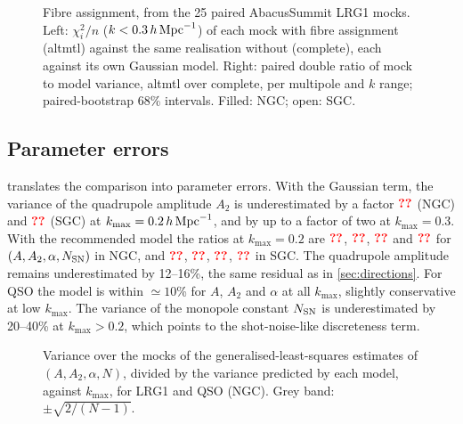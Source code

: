 \begin{figure}
  \centering{}
  \caption{Fibre assignment, from the 25 paired AbacusSummit LRG1 mocks. Left: $\chi^2_i/n$ ($k<0.3\,h\,\mathrm{Mpc}^{-1}$) of each mock with fibre assignment (altmtl) against the same realisation without (complete), each against its own Gaussian model. Right: paired double ratio of mock to model variance, altmtl over complete, per multipole and $k$ range; paired-bootstrap $68$\% intervals. Filled: NGC; open: SGC.}
  \label{fig:fiber}
\end{figure}

\subsection{Parameter errors}
\label{sec:params}

 translates the comparison into parameter errors. With the Gaussian term, the variance of the quadrupole amplitude $A_2$ is underestimated by a factor $\val{par/LRG1/NGC/G/0.200/A2}$ (NGC) and $\val{par/LRG1/SGC/G/0.200/A2}$ (SGC) at $k_{\max}=0.2\,h\,\mathrm{Mpc}^{-1}$, and by up to a factor of two at $k_{\max}=0.3$. With the recommended model the ratios at $k_{\max}=0.2$ are $\val{par/LRG1/NGC/rec/0.200/A}$, $\val{par/LRG1/NGC/rec/0.200/A2}$, $\val{par/LRG1/NGC/rec/0.200/alpha}$ and $\val{par/LRG1/NGC/rec/0.200/SN}$ for $(A,A_2,\alpha,N_{\rm SN})$ in NGC, and $\val{par/LRG1/SGC/rec/0.200/A}$, $\val{par/LRG1/SGC/rec/0.200/A2}$, $\val{par/LRG1/SGC/rec/0.200/alpha}$, $\val{par/LRG1/SGC/rec/0.200/SN}$ in SGC. The quadrupole amplitude remains underestimated by 12--16\%, the same residual as in \cref{sec:directions}. For QSO the model is within $\simeq10$\% for $A$, $A_2$ and $\alpha$ at all $k_{\max}$, slightly conservative at low $k_{\max}$. The variance of the monopole constant $N_{\rm SN}$ is underestimated by 20--40\% at $k_{\max}>0.2$, which points to the shot-noise-like discreteness term.

\begin{figure}
  \centering{}
  \caption{Variance over the mocks of the generalised-least-squares estimates of $(A,A_2,\alpha,N)$, divided by the variance predicted by each model, against $k_{\max}$, for LRG1 and QSO (NGC). Grey band: $\pm\sqrt{2/(N-1)}$.}
  \label{fig:params}
\end{figure}
